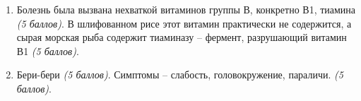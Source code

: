 \solutionSection
\begin{enumerate}
    \item Болезнь была вызвана нехваткой витаминов группы В, конкретно В1, тиамина \textit{(5 баллов)}. В шлифованном рисе этот витамин практически не содержится, а сырая морская рыба содержит тиаминазу – фермент, разрушающий витамин В1 \textit{(5 баллов)}.
    \item Бери-бери \textit{(5 баллов)}. Симптомы – слабость, головокружение, параличи. \textit{(5 баллов)}.
    \end{enumerate}